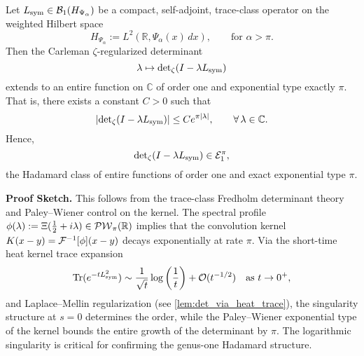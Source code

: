 \begin{lemma}
\label{lem:det_identity_entire_order_one}
Let \( L_{\mathrm{sym}} \in \mathcal{B}_1(H_{\Psi_\alpha}) \) be a compact, self-adjoint, trace-class operator on the weighted Hilbert space
\[
H_{\Psi_\alpha} := L^2(\mathbb{R}, \Psi_\alpha(x)\, dx), \qquad \text{for } \alpha > \pi.
\]
Then the Carleman \(\zeta\)-regularized determinant
\[
\lambda \mapsto \det\nolimits_{\zeta}(I - \lambda L_{\mathrm{sym}})
\]
extends to an entire function on \( \mathbb{C} \) of order one and exponential type exactly \( \pi \). That is, there exists a constant \( C > 0 \) such that
\[
\left| \det\nolimits_{\zeta}(I - \lambda L_{\mathrm{sym}}) \right| \le C e^{\pi |\lambda|}, \qquad \forall\, \lambda \in \mathbb{C}.
\]
Hence,
\[
\det\nolimits_{\zeta}(I - \lambda L_{\mathrm{sym}}) \in \mathcal{E}_1^\pi,
\]
the Hadamard class of entire functions of order one and exact exponential type \( \pi \).

\medskip
\noindent
\textbf{Proof Sketch.} This follows from the trace-class Fredholm determinant theory~\cite[Ch.~4]{Simon2005TraceIdeals} and Paley–Wiener control on the kernel. The spectral profile \( \phi(\lambda) := \Xi(\tfrac{1}{2} + i\lambda) \in \mathcal{PW}_{\pi}(\mathbb{R}) \) implies that the convolution kernel \( K(x - y) = \mathcal{F}^{-1}[\phi](x - y) \) decays exponentially at rate \( \pi \). Via the short-time heat kernel trace expansion
\[
\operatorname{Tr}(e^{-t L_{\mathrm{sym}}^2}) \sim \frac{1}{\sqrt{t}} \log\left(\frac{1}{t}\right) + \mathcal{O}(t^{-1/2}) \quad \text{as } t \to 0^+,
\]
and Laplace–Mellin regularization (see \cref{lem:det_via_heat_trace}), the singularity structure at \( s = 0 \) determines the order, while the Paley–Wiener exponential type of the kernel bounds the entire growth of the determinant by \( \pi \). The logarithmic singularity is critical for confirming the genus-one Hadamard structure.
\end{lemma}
